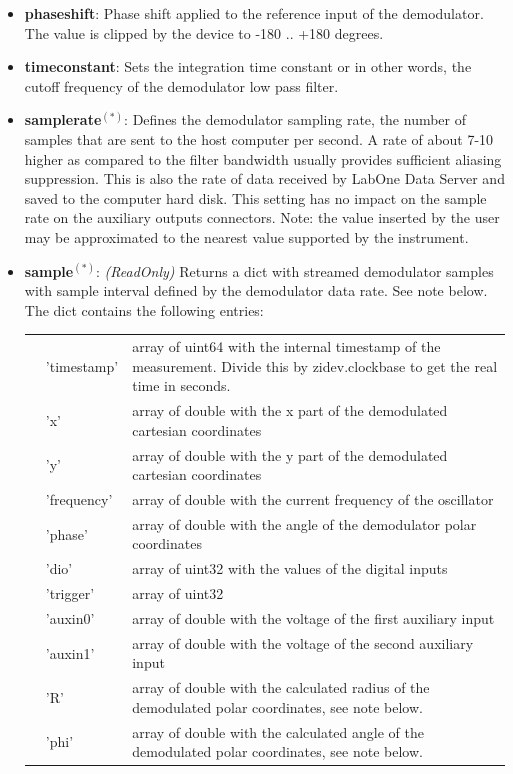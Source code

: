 \documentclass[11pt]{article} %
\begin{document}
\begin{itemize}
	\item {\bf phaseshift}: Phase shift applied to the reference input of the demodulator. The value is clipped by the device to -180 .. +180 degrees.
	\item {\bf timeconstant}: Sets the integration time constant or in other words, the cutoff frequency of the demodulator low pass filter.
	\item {\bf samplerate}$^{(*)}$: Defines the demodulator sampling rate, the number of samples that are sent to the host computer per second. A rate of about 7-10 higher as compared to the filter bandwidth usually provides sufficient aliasing suppression. This is also the rate of data received by LabOne Data Server and saved to the computer hard disk. This setting has no impact on the sample rate on the auxiliary outputs connectors. Note: the value inserted by the user may be approximated to the nearest value supported by the instrument.
	\item {\bf sample}$^{(*)}$: {\it (ReadOnly)} Returns a dict with streamed demodulator samples with sample interval defined by the demodulator data rate. See note below. The dict contains the following entries:
	\begin{longtable}{p{1.5cm}p{3cm}p{12cm}}
	& 'timestamp' & array of uint64 with the internal timestamp of the measurement. Divide this by zidev.clockbase to get the real time in seconds. \\
	& 'x' & array of double with the x part of the demodulated cartesian coordinates \\
	& 'y' & array of double with the y part of the demodulated cartesian coordinates \\
	& 'frequency' & array of double with the current frequency of the oscillator \\
	& 'phase' & array of double with the angle of the demodulator polar coordinates \\
	& 'dio' & array of uint32 with the values of the digital inputs \\
	& 'trigger' & array of uint32 \\
	& 'auxin0' & array of double with the voltage of the first auxiliary input \\
	& 'auxin1' & array of double with the voltage of the second auxiliary input \\
	& 'R' & array of double with the calculated radius of the demodulated polar coordinates, see note below. \\
	& 'phi' & array of double with the calculated angle of the demodulated polar coordinates, see note below. \\

\end{longtable}
\end{itemize}
\end{document}
